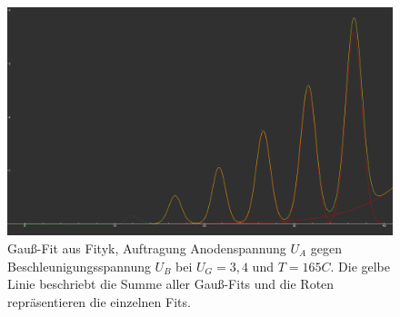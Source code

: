\documentclass{article}
\begin{document}
\begin{figure}[H]
  \centering
  \includegraphics[scale=0.2]{FH_3,4_165C.png}
  \caption{Gauß-Fit aus Fityk, Auftragung Anodenspannung $U_A$ gegen Beschleunigungsspannung $U_B$ bei $U_G=3,4$ und $T=165C$. Die gelbe
  Linie beschriebt die Summe aller Gauß-Fits und die Roten repräsentieren die einzelnen Fits.}
  \label{FH 3,4V_165C}
\end{figure}
\end{document}
